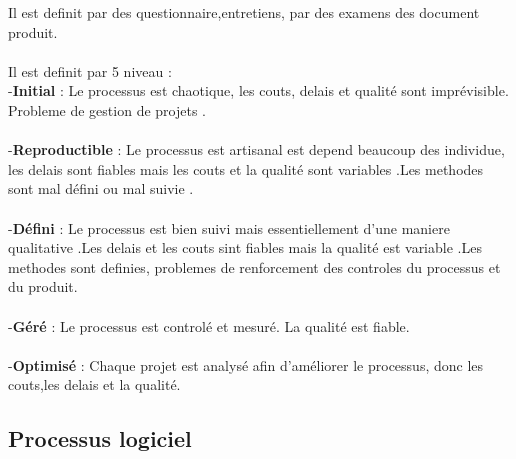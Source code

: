 \documentclass[a4paper,12pt,openany]{book}
\begin{document}
Il est definit par des questionnaire,entretiens, par des examens des document produit.\\
\\
Il est definit par 5 niveau : \\
-\textbf{Initial} : Le processus est chaotique, les couts, delais et qualité sont imprévisible. Probleme de gestion de projets .\\
\\
-\textbf{Reproductible} : Le processus est artisanal est depend beaucoup des individue, les delais sont fiables mais les couts et la qualité sont variables .Les methodes sont mal défini ou mal suivie .\\
\\
-\textbf{Défini} : Le processus est bien suivi mais essentiellement d'une maniere qualitative .Les delais et les couts sint fiables mais la qualité est variable .Les methodes sont definies, problemes de renforcement des controles du processus et du produit.\\
\\
-\textbf{Géré} : Le processus est controlé et mesuré. La qualité est fiable.\\
\\
-\textbf{Optimisé} : Chaque projet est analysé afin d'améliorer le processus, donc les couts,les delais et la qualité.\\


\subsection{Processus logiciel}
\end{document}
